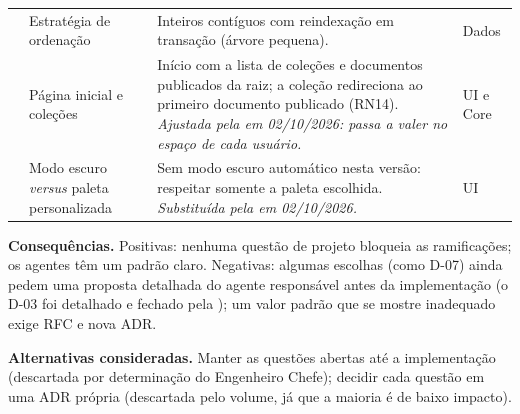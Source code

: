 \begin{longtable}{@{}L{1.1cm}L{3.2cm}L{8.4cm}L{1.7cm}@{}}
 & Estratégia de ordenação & Inteiros contíguos com reindexação em transação (árvore pequena). & Dados\\[1pt]
 & Página inicial e coleções & Início com a lista de coleções e documentos publicados da raiz; a coleção redireciona ao primeiro documento publicado (RN14). \emph{Ajustada pela  em 02/10/2026: passa a valer no espaço de cada usuário.} & UI e Core\\[1pt]
 & Modo escuro \emph{versus} paleta personalizada & Sem modo escuro automático nesta versão: respeitar somente a paleta escolhida. \emph{Substituída pela  em 02/10/2026.} & UI\\[1pt]
\end{longtable}
\endgroup

\noindent\textbf{Consequências.} Positivas: nenhuma questão de projeto bloqueia as ramificações; os agentes têm um padrão claro. Negativas: algumas escolhas (como D-07) ainda pedem uma proposta detalhada do agente responsável antes da implementação (o D-03 foi detalhado e fechado pela ); um valor padrão que se mostre inadequado exige RFC e nova ADR.\par\smallskip
\noindent\textbf{Alternativas consideradas.} Manter as questões abertas até a implementação (descartada por determinação do Engenheiro Chefe); decidir cada questão em uma ADR própria (descartada pelo volume, já que a maioria é de baixo impacto).\par\medskip


